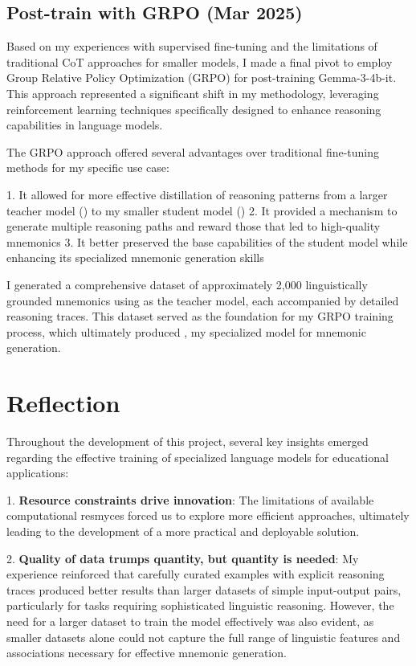 \subsection{Post-train \studentmodel with GRPO (Mar 2025)} \label{app:gemma3-grpo}

Based on my experiences with supervised fine-tuning and the limitations of traditional CoT approaches for smaller models, I made a final pivot to employ Group Relative Policy Optimization (GRPO) \citep{DeepSeek-AIDEEPSEEKR12025} for post-training Gemma-3-4b-it. This approach represented a significant shift in my methodology, leveraging reinforcement learning techniques specifically designed to enhance reasoning capabilities in language models.

The GRPO approach offered several advantages over traditional fine-tuning methods for my specific use case:

1. It allowed for more effective distillation of reasoning patterns from a larger teacher model (\teachermodel) to my smaller student model (\studentmodel)
2. It provided a mechanism to generate multiple reasoning paths and reward those that led to high-quality mnemonics
3. It better preserved the base capabilities of the student model while enhancing its specialized mnemonic generation skills

I generated a comprehensive dataset of approximately 2,000 linguistically grounded mnemonics using \teachermodel as the teacher model, each accompanied by detailed reasoning traces. This dataset served as the foundation for my GRPO training process, which ultimately produced \linksys, my specialized model for mnemonic generation.

\section{Reflection} \label{sec:reflection}

Throughout the development of this project, several key insights emerged regarding the effective training of specialized language models for educational applications:

1. \textbf{Resource constraints drive innovation}: The limitations of available computational resmyces forced us to explore more efficient approaches, ultimately leading to the development of a more practical and deployable solution.

2. \textbf{Quality of data trumps quantity, but quantity is needed}: My experience reinforced that carefully curated examples with explicit reasoning traces produced better results than larger datasets of simple input-output pairs, particularly for tasks requiring sophisticated linguistic reasoning. However, the need for a larger dataset to train the model effectively was also evident, as smaller datasets alone could not capture the full range of linguistic features and associations necessary for effective mnemonic generation.

